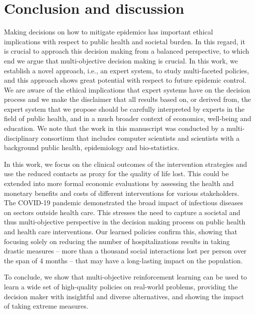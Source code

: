 \documentclass{article}
\begin{document}
\section{Conclusion and discussion}
Making decisions on how to mitigate epidemics has important ethical implications with respect to public health and societal burden. In this regard, it is crucial to approach this decision making from a balanced perspective, to which end we argue that multi-objective decision making is crucial. In this work, we establish a novel approach, i.e., an expert system, to study multi-faceted policies, and this approach shows great potential with respect to future epidemic control. We are aware of the ethical implications that expert systems have on the decision process and we make the disclaimer that all results based on, or derived from, the expert system that we propose should be carefully interpreted by experts in the field of public health, and in a much broader context of economics, well-being and education. We note that the work in this manuscript was conducted by a multi-disciplinary consortium that includes computer scientists and scientists with a background public health, epidemiology and bio-statistics.

In this work, we focus on the clinical outcomes of the intervention strategies and use the reduced contacts as proxy for the quality of life lost. This could be extended into more formal economic evaluations by assessing the health and monetary benefits and costs of different interventions for various stakeholders. The COVID-19 pandemic demonstrated the broad impact of infectious diseases on sectors outside health care. This stresses the need to capture a societal and thus multi-objective perspective in the decision making process on public health and health care interventions. Our learned policies confirm this, showing that focusing solely on reducing the number of hospitalizations results in taking drastic measures -- more than a thousand social interactions lost per person over the span of 4 months -- that may have a long-lasting impact on the population.

To conclude, we show that multi-objective reinforcement learning can be used to learn a wide set of high-quality policies on real-world problems, providing the decision maker with insightful and diverse alternatives, and showing the impact of taking extreme measures.
\end{document}
